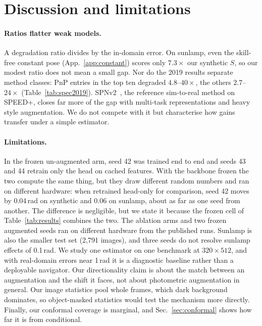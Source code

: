\documentclass{article}
\begin{document}
\section{Discussion and limitations}
\label{sec:discussion}

\paragraph{Ratios flatter weak models.} A degradation ratio divides by the in-domain error. On
sunlamp, even the skill-free constant pose (App.~\ref{app:constant}) scores only $7.3\times$
our synthetic $S$, so our modest ratio does not mean a small gap. Nor do the 2019 results
separate method classes: PnP entries in the top ten degraded $4.8$--$40\times$, the others
$2.7$--$24\times$ (Table~\ref{tab:spec2019}). SPNv2~\citep{park2024spnv2}, the reference
sim-to-real method on SPEED+, closes far more of the gap with multi-task representations and
heavy style augmentation. We do not compete with it but characterise how gains transfer under
a simple estimator.

\paragraph{Limitations.} In the frozen un-augmented arm, seed 42 was trained end to end and
seeds 43 and 44 retrain only the head on cached features. With the backbone frozen the two
compute the same thing, but they draw different random numbers and ran on different hardware:
when retrained head-only for comparison, seed 42 moves by 0.04\,rad on synthetic and 0.06 on
sunlamp, about as far as one seed from another. The difference is negligible, but we state it
because the frozen cell of Table~\ref{tab:results} combines the two. The ablation arms and two frozen augmented seeds
ran on different hardware from the published runs. Sunlamp is also the smaller test set
(2{,}791 images), and three seeds do not resolve sunlamp effects of 0.1\,rad. We study one
estimator on one benchmark at $320{\times}512$, and with real-domain errors near 1\,rad it is a
diagnostic baseline rather than a deployable navigator. Our directionality claim is about the
match between an augmentation and the shift it faces, not about photometric augmentation in
general. Our image statistics pool whole frames, which dark background dominates, so
object-masked statistics would test the mechanism more directly. Finally, our conformal
coverage is marginal, and Sec.~\ref{sec:conformal} shows how far it is from conditional.
\end{document}
